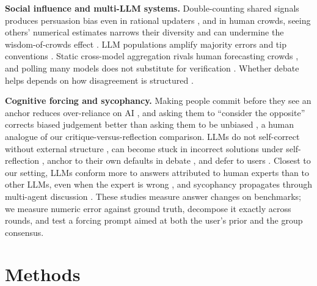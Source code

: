 \documentclass[10pt]{article}
\theoremstyle{manuscript}\newtheorem{proposition}{Proposition}
\begin{document}
\textbf{Social influence and multi-LLM systems.} Double-counting shared signals produces persuasion bias even in rational updaters \citep{demarzo2003,goldman2001}, and in human crowds, seeing others' numerical estimates narrows their diversity and can undermine the wisdom-of-crowds effect \citep{lorenz2011}. LLM populations amplify majority errors and tip conventions \citep{ashery2025,centola2018,chuang2023,estornell2024,wynn2025}. Static cross-model aggregation rivals human forecasting crowds \citep{schoenegger2024,chuang2025}, and polling many models does not substitute for verification \citep{denisov2026}. Whether debate helps depends on how disagreement is structured \citep{quattrociocchi2025,schneider2025,smit2024,wang2024}.

\textbf{Cognitive forcing and sycophancy.} Making people commit before they see an anchor reduces over-reliance on AI \citep{bucinca2021}, and asking them to ``consider the opposite'' corrects biased judgement better than asking them to be unbiased \citep{lord1984}, a human analogue of our critique-versus-reflection comparison. LLMs do not self-correct without external structure \citep{huang2024}, can become stuck in incorrect solutions under self-reflection \citep{liang2024}, anchor to their own defaults in debate \citep{taubenfeld2024}, and defer to users \citep{sharma2024,deepthika2026,kelley2026,finnveden2024}. Closest to our setting, LLMs conform more to answers attributed to human experts than to other LLMs, even when the expert is wrong \citep{bajaj2026}, and sycophancy propagates through multi-agent discussion \citep{kasprova2026}. These studies measure answer changes on benchmarks; we measure numeric error against ground truth, decompose it exactly across rounds, and test a forcing prompt aimed at both the user's prior and the group consensus.

\section{Methods}\label{sec:setup}
\end{document}
